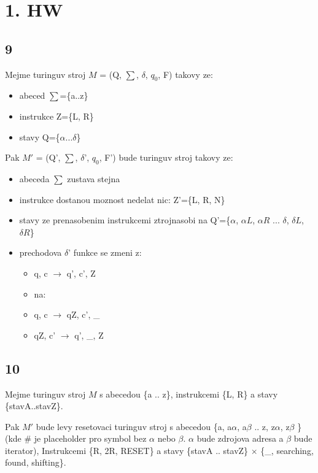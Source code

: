 \documentclass[a4paper]{article}
\begin{document}
\pagestyle{fancy}

\section*{1. HW}
\subsection*{9}
Mejme turinguv stroj $M$ = (Q, $\sum$, $\delta$, $q_0$, F) takovy ze:
\begin{itemize}
	\item abeced $\sum$=\{a..z\}
	\item instrukce Z=\{L, R\}
	\item stavy Q=\{$\alpha ... \delta$\}
\end{itemize}

Pak $M'$ = (Q', $\sum$, $\delta$', $q_0$, F') bude turinguv stroj takovy ze:
\begin{itemize}
	\item abeceda $\sum$ zustava stejna
	\item instrukce dostanou moznost nedelat nic: Z'=\{L, R, N\}
	\item stavy ze prenasobenim instrukcemi ztrojnasobi na Q'=\{$\alpha$, $\alpha L$, $\alpha R$ ... $\delta$, $\delta L$, $\delta R$\}
	\item prechodova $\delta$' funkce se zmeni z:
	\begin{itemize}
		\item q, c $\rightarrow$ q', c', Z
		\item na:
		\item q, c $\rightarrow$ qZ, c', \_
		\item qZ, c' $\rightarrow$ q', \_, Z
	\end{itemize}
\end{itemize}




\subsection*{10}
Mejme turinguv stroj $M$ s abecedou \{a .. z\}, instrukcemi \{L, R\} a stavy \{stavA..stavZ\}.

Pak $M'$ bude levy resetovaci turinguv stroj s abecedou
\{a, a$\alpha$, a$\beta$ .. z, z$\alpha$, z$\beta$ \}
(kde \# je placeholder pro symbol bez $\alpha$ nebo $\beta$. $\alpha$ bude zdrojova adresa a $\beta$ bude iterator),
Instrukcemi \{R, 2R, RESET\} a stavy \{stavA .. stavZ\} $\times$ \{\_, searching, found, shifting\}.
\end{document}
